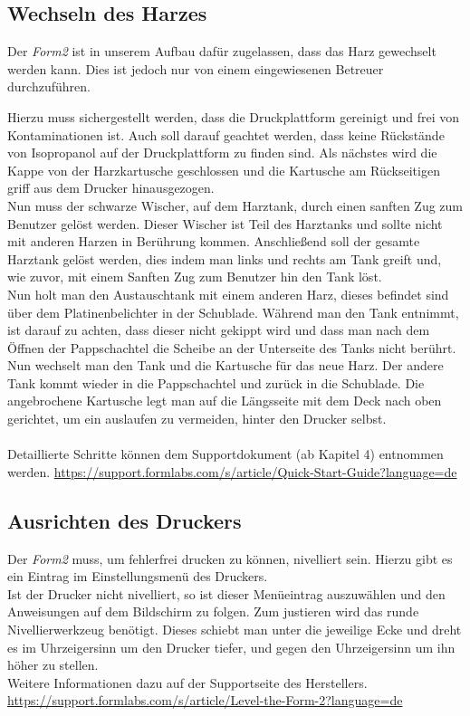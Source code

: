 \documentclass{\basedir/fablab-document}
\begin{document}
\subsection{Wechseln des Harzes}
Der \textit{Form2} ist in unserem Aufbau dafür zugelassen, dass das Harz gewechselt werden kann. Dies ist jedoch nur von einem eingewiesenen Betreuer durchzuführen. 

Hierzu muss sichergestellt werden, dass die Druckplattform gereinigt und frei von Kontaminationen ist. Auch soll darauf geachtet werden, dass keine Rückstände von Isopropanol auf der Druckplattform zu finden sind. Als nächstes wird die Kappe von der Harzkartusche geschlossen und die Kartusche am Rückseitigen griff aus dem Drucker hinausgezogen.\\
Nun muss der schwarze Wischer, auf dem Harztank, durch einen sanften Zug zum Benutzer gelöst werden. Dieser Wischer ist Teil des Harztanks und sollte nicht mit anderen Harzen in Berührung kommen. Anschließend soll der gesamte Harztank gelöst werden, dies indem man links und rechts am Tank greift und, wie zuvor, mit einem Sanften Zug zum Benutzer hin den Tank löst. \\
Nun holt man den Austauschtank mit einem anderen Harz, dieses befindet sind über dem Platinenbelichter in der Schublade. Während man den Tank entnimmt, ist darauf zu achten, dass dieser nicht gekippt wird und dass man nach dem Öffnen der Pappschachtel die Scheibe an der Unterseite des Tanks nicht berührt. \\
Nun wechselt man den Tank und die Kartusche für das neue Harz. Der andere Tank kommt wieder in die Pappschachtel und zurück in die Schublade. Die angebrochene Kartusche legt man auf die Längsseite mit dem Deck nach oben gerichtet, um ein auslaufen zu vermeiden, hinter den Drucker selbst. \\
\\
Detaillierte Schritte können dem Supportdokument (ab Kapitel 4) entnommen werden. 
\url{https://support.formlabs.com/s/article/Quick-Start-Guide?language=de}


\subsection{Ausrichten des Druckers}
Der \textit{Form2} muss, um fehlerfrei drucken zu können, nivelliert sein. Hierzu gibt es ein Eintrag im Einstellungsmenü des Druckers.\\
Ist der Drucker nicht nivelliert, so ist dieser Menüeintrag auszuwählen und den Anweisungen auf dem Bildschirm zu folgen. Zum justieren wird das runde Nivellierwerkzeug benötigt. Dieses schiebt man unter die jeweilige Ecke und dreht es im Uhrzeigersinn um den Drucker tiefer, und gegen den Uhrzeigersinn um ihn höher zu stellen.\\
Weitere Informationen dazu auf der Supportseite des Herstellers.	\\
\url{https://support.formlabs.com/s/article/Level-the-Form-2?language=de}
\end{document}
